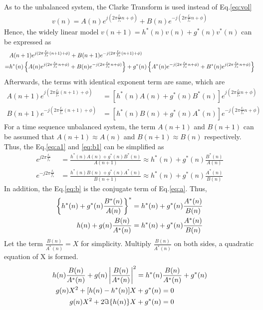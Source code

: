 As to the unbalanced system, the Clarke Transform is used instead of Eq.\ref{eq:vol}
\begin{align}
v(n)=A(n)e^{j(2\pi\frac{f_o}{f_s}n+\phi)}+B(n)e^{-j(2\pi\frac{f_o}{f_s}n+\phi)}\label{eq:unvol}
\end{align}
Hence, the widely linear model $v(n+1)=h^*(n)v(n)+g^*(n)v^*(n)
$ can be expressed as
\begin{align}
&A(n+1)e^{j(2\pi\frac{f_o}{f_s}(n+1)+\phi)}+B(n+1)e^{-j(2\pi\frac{f_o}{f_s}(n+1)+\phi)}\notag\\
=&h^*(n)\left\{A(n)e^{j(2\pi\frac{f_o}{f_s}n+\phi)}+B(n)e^{-j(2\pi\frac{f_o}{f_s}n+\phi)}\right\}+g^*(n)\left\{A^*(n)e^{-j(2\pi\frac{f_o}{f_s}n+\phi)}+B^*(n)e^{j(2\pi\frac{f_o}{f_s}n+\phi)}\right\}
\end{align}
Afterwards, the terms with identical exponent term are same, which are
\begin{align}
A(n+1)e^{j(2\pi\frac{f_o}{f_s}(n+1)+\phi)}&=[h^*(n)A(n)+g^*(n)B^*(n)]e^{j(2\pi\frac{f_o}{f_s}n+\phi)}\label{eq:a1}\\
B(n+1)e^{-j(2\pi\frac{f_o}{f_s}(n+1)+\phi)}&=[h^*(n)B(n)+g^*(n)A^*(n)]e^{-j(2\pi\frac{f_o}{f_s}n+\phi)}\label{eq:b1}
\end{align}
For a time sequence unbalanced system, the term $A(n+1)$ and $B(n+1)$ can be assumed that $A(n+1)\approx A(n)$ and $B(n+1)\approx B(n)$ respectively. Thus, the Eq.\ref{eq:a1} and \ref{eq:b1} can be simplified as
\begin{align}
e^{j2\pi\frac{f_o}{f_s}}&=\frac{h^*(n)A(n)+g^*(n)B^*(n)}{A(n+1)} \approx h^*(n)+g^*(n)\frac{B^*(n)}{A(n)}\label{eq:a}\\
e^{-j2\pi\frac{f_o}{f_s}}&=\frac{h^*(n)B(n)+g^*(n)A^*(n)}{B(n+1)} \approx h^*(n)+g^*(n)\frac{A^*(n)}{B(n)}\label{eq:b}
\end{align}
In addition, the Eq.\ref{eq:b} is the conjugate term of Eq.\ref{eq:a}. Thus, 
\begin{align}
\left\{h^*(n)+g^*(n)\frac{B^*(n)}{A(n)}\right\}^* & =h^*(n)+g^*(n)\frac{A^*(n)}{B(n)}\notag\\
h(n)+g(n)\frac{B(n)}{A^*(n)}&=h^*(n)+g^*(n)\frac{A^*(n)}{B(n)}\label{eq:b2}
\end{align}
Let the term $\frac{B(n)}{A^*(n)}=X$ for simplicity. Multiply $\frac{B(n)}{A^*(n)}$ on both sides, a quadratic equation of X is formed.
\begin{align}
h(n)\frac{B(n)}{A^*(n)}+g(n)\left |\frac{B(n)}{A^*(n)}\right|^2&=h^*(n)\frac{B(n)}{A^*(n)}+g^*(n)\notag\\
g(n)X^2+[h(n)-h^*(n)]X&+g^*(n)=0\notag\\
g(n)X^2+2\Im \{h(n)\}X&+g^*(n)=0
\end{align}
